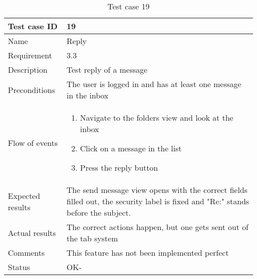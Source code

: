 		\clearpage

		\begin{table}
			\begin{tabular}{l|p{10cm}}
				Test case ID & 19 \\ \hline
				Name & Reply\\ \hline
				Requirement & 3.3\\ \hline
				Description & Test reply of a message\\ \hline
				Preconditions & The user is logged in and has at least one message in the inbox\\ \hline
				Flow of events & 
					\begin{enumerate}
						\item{}Navigate to the folders view and look at the inbox
						\item{}Click on a message in the list
						\item{}Press the reply button
					\end{enumerate} \\ \hline
				Expected results & The send message view opens with the correct fields filled out, the security label is fixed and "Re:" stands before the subject. \\ \hline
				Actual results &The correct actions happen, but one gets sent out of the tab system\\ \hline
				Comments & This feature has not been implemented perfect\\ \hline
				Status & OK-\\ \hline
			\end{tabular}
			\caption{Test case 19} \label{tab:case19}
		\end{table}

